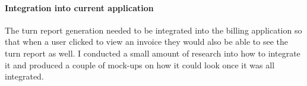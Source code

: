 {{		\paragraph{Integration into current application}{
			The turn report generation needed to be integrated into the billing application so that when a user clicked to view an invoice they would also be able to see the turn report as well. I conducted a small amount of research into how to integrate it and produced a couple of mock-ups on how it could look once it was all integrated.
		}
	}
}